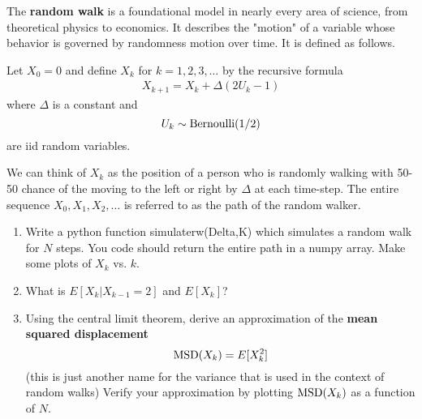 \begin{exercise}
The {\bf random walk} is a foundational model in nearly every area of science, from theoretical physics to economics. It describes the "motion" of a variable whose behavior is governed by randomness motion over time. It is defined as follows. 

Let $X_0=0$ and define $X_k$ for $k=1,2,3,\dots$ by the recursive formula 
\begin{align}\label{eq:rw}
X_{k+1} = X_{k}  + \Delta(2U_k - 1)
\end{align}
where $\Delta$ is a constant and 
\begin{equation*}
U_k  \sim {\rm Bernoulli}(1/2)
\end{equation*}
are iid random variables. 


We can think of $X_k$ as the position of a person who is randomly walking with 50-50 chance of the moving to the left or right by $\Delta$ at each time-step. The entire sequence $X_0,X_1,X_2,\dots$ is referred to as the path of the random walker. 
\begin{enumerate}[label=(\alph*)]
\item Write a python function simulaterw(Delta,K) which simulates a random walk for $N$ steps. You code should return the entire path in a numpy array. Make some plots of $X_k$ vs. $k$. 
\item What is $E[X_k|X_{k-1}=2]$ and $E[X_k]$? 
\item Using the central limit theorem, derive an approximation of the {\bf mean squared displacement}
\begin{equation*}
{\rm MSD}(X_k) = E[X_k^2]
\end{equation*}
(this is just another name for the variance that is used in the context of random walks)
Verify your approximation by plotting ${\rm MSD}(X_k)$ as a function of $N$. 
\end{enumerate}


\end{exercise}









